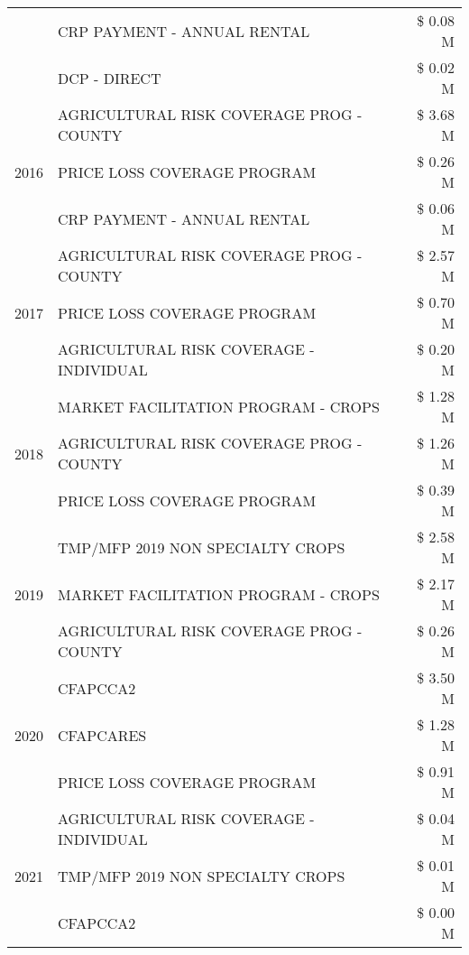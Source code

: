 \begin{tabular}{llr}
 & CRP PAYMENT - ANNUAL RENTAL & \$ 0.08 M \\
 & DCP - DIRECT & \$ 0.02 M \\
\cline{1-3}
\multirow[t]{3}{*}{2016} & AGRICULTURAL RISK COVERAGE PROG - COUNTY & \$ 3.68 M \\
 & PRICE LOSS COVERAGE PROGRAM & \$ 0.26 M \\
 & CRP PAYMENT - ANNUAL RENTAL & \$ 0.06 M \\
\cline{1-3}
\multirow[t]{3}{*}{2017} & AGRICULTURAL RISK COVERAGE PROG - COUNTY & \$ 2.57 M \\
 & PRICE LOSS COVERAGE PROGRAM & \$ 0.70 M \\
 & AGRICULTURAL RISK COVERAGE - INDIVIDUAL & \$ 0.20 M \\
\cline{1-3}
\multirow[t]{3}{*}{2018} & MARKET FACILITATION PROGRAM - CROPS & \$ 1.28 M \\
 & AGRICULTURAL RISK COVERAGE PROG - COUNTY & \$ 1.26 M \\
 & PRICE LOSS COVERAGE PROGRAM & \$ 0.39 M \\
\cline{1-3}
\multirow[t]{3}{*}{2019} & TMP/MFP 2019 NON SPECIALTY CROPS & \$ 2.58 M \\
 & MARKET FACILITATION PROGRAM - CROPS & \$ 2.17 M \\
 & AGRICULTURAL RISK COVERAGE PROG - COUNTY & \$ 0.26 M \\
\cline{1-3}
\multirow[t]{3}{*}{2020} & CFAPCCA2 & \$ 3.50 M \\
 & CFAPCARES & \$ 1.28 M \\
 & PRICE LOSS COVERAGE PROGRAM & \$ 0.91 M \\
\cline{1-3}
\multirow[t]{3}{*}{2021} & AGRICULTURAL RISK COVERAGE - INDIVIDUAL & \$ 0.04 M \\
 & TMP/MFP 2019 NON SPECIALTY CROPS & \$ 0.01 M \\
 & CFAPCCA2 & \$ 0.00 M \\
\cline{1-3}
\bottomrule
\end{tabular}
